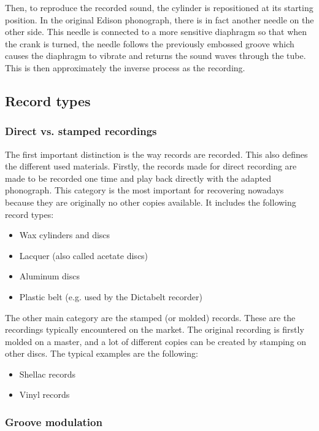 Then, to reproduce the recorded sound, the cylinder is repositioned at its starting position. In the original Edison phonograph, there is in fact another needle on the other side. This needle is connected to a more sensitive diaphragm so that when the crank is turned, the needle follows the previously embossed groove which causes the diaphragm to vibrate and returns the sound waves through the tube. This is then approximately the inverse process as the recording.

\subsection{Record types}
\label{sec:rectypes}

\subsubsection{Direct vs. stamped recordings}

The first important distinction is the way records are recorded. This also defines the different used materials. Firstly, the records made for direct recording are made to be recorded one time and play back directly with the adapted phonograph. This category is the most important for recovering nowadays because they are originally no other copies available. It includes the following record types:

\begin{itemize}
\item Wax cylinders and discs
\item Lacquer (also called acetate discs)
\item Aluminum discs
\item Plastic belt (e.g. used by the Dictabelt recorder)
\end{itemize}

The other main category are the stamped (or molded) records. These are the recordings typically encountered on the market. The original recording is firstly molded on a master, and a lot of different copies can be created by stamping on other discs. The typical examples are the following:

\begin{itemize}
\item Shellac records
\item Vinyl records
\end{itemize}

\subsubsection{Groove modulation}


